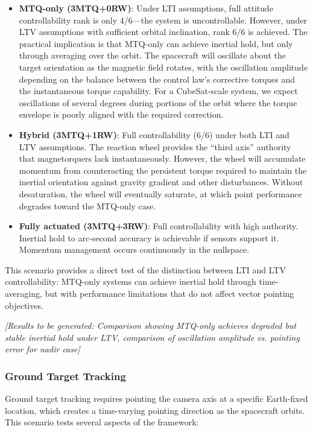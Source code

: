 \documentclass[conference]{IEEEtran}
\begin{document}
\begin{itemize}
    \item \textbf{MTQ-only (3MTQ+0RW)}: Under LTI assumptions, full attitude controllability rank is only 4/6---the system is uncontrollable. However, under LTV assumptions with sufficient orbital inclination, rank 6/6 is achieved. The practical implication is that MTQ-only can achieve inertial hold, but only through averaging over the orbit. The spacecraft will oscillate about the target orientation as the magnetic field rotates, with the oscillation amplitude depending on the balance between the control law's corrective torques and the instantaneous torque capability. For a CubeSat-scale system, we expect oscillations of several degrees during portions of the orbit where the torque envelope is poorly aligned with the required correction.

    \item \textbf{Hybrid (3MTQ+1RW)}: Full controllability (6/6) under both LTI and LTV assumptions. The reaction wheel provides the ``third axis'' authority that magnetorquers lack instantaneously. However, the wheel will accumulate momentum from counteracting the persistent torque required to maintain the inertial orientation against gravity gradient and other disturbances. Without desaturation, the wheel will eventually saturate, at which point performance degrades toward the MTQ-only case.

    \item \textbf{Fully actuated (3MTQ+3RW)}: Full controllability with high authority. Inertial hold to arc-second accuracy is achievable if sensors support it. Momentum management occurs continuously in the nullspace.
\end{itemize}

This scenario provides a direct test of the distinction between LTI and LTV controllability: MTQ-only systems can achieve inertial hold through time-averaging, but with performance limitations that do not affect vector pointing objectives.

\emph{[Results to be generated: Comparison showing MTQ-only achieves degraded but stable inertial hold under LTV, comparison of oscillation amplitude vs. pointing error for nadir case]}

\subsubsection{Ground Target Tracking}
Ground target tracking requires pointing the camera axis at a specific Earth-fixed location, which creates a time-varying pointing direction as the spacecraft orbits. This scenario tests several aspects of the framework:
\end{document}
